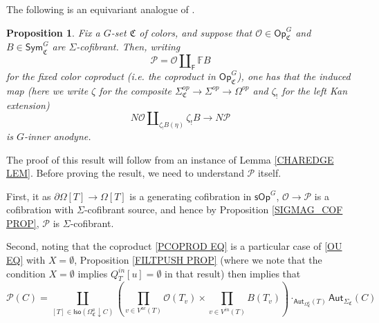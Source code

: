 \documentclass[a4paper,10pt
,draft
]{article}%
\numberwithin{equation}{section}
\numberwithin{figure}{section}
\newtheorem{proposition}[equation]{Proposition}%
\theoremstyle{definition} %
\newcommand{\Op}{\mathsf{Op}}%
\newcommand{\sOp}{\ensuremath{\mathsf{sOp}}}%
\renewcommand{\O}{\ensuremath{\mathcal O}}
\renewcommand{\P}{\ensuremath{\mathcal P}}
\newcommand{\1}{\ensuremath{\mathbbm 1}}%
\begin{document}
The following is an equivariant analogue of \cite[Prop. 3.2]{CM13b}.

\begin{proposition}\label{KEYPR PROP}
	Fix a $G$-set $\mathfrak{C}$ of colors,
	and suppose that 
	$\mathcal{O} \in \mathsf{Op}^{G}_{\mathfrak{C}}$
	and
	$B \in \mathsf{Sym}^{G}_{\mathfrak{C}}$
	are
	$\Sigma$-cofibrant.
	Then, writing
	\begin{equation}\label{PCOPROD EQ}
	\mathcal{P} = \mathcal{O} \amalg_{\mathsf{F}} \mathbb{F} B
	\end{equation}
	for the fixed color coproduct (i.e. the coproduct in $\Op^{G}_{ \mathfrak C}$),
	one has that the induced map
	(here we write $\zeta$ for the composite
	$\Sigma_{\mathfrak{C}}^{op} \to \Sigma^{op} \to \Omega^{op}$
	and $\zeta_!$ for the left Kan extension)
	\begin{equation}\label{ANODYNEMAP EQ}
	N \mathcal{O} \amalg_{\zeta_!B (\eta)} \zeta_!B \to N \mathcal{P}
	\end{equation}
	is $G$-inner anodyne.
%
\end{proposition}


The proof of this result will follow from an instance of 
Lemma \ref{CHAREDGE LEM}. 
Before proving the result, we need to understand $\mathcal{P}$ itself.

First, it as $\partial \Omega[T] \to \Omega[T]$ is a generating cofibration in $\sOp^G$,
$\O \to \P$ is a cofibration with $\Sigma$-cofibrant source, and hence by Proposition \ref{SIGMAG_COF PROP},
$\P$ is $\Sigma$-cofibrant.

Second, noting that the coproduct \eqref{PCOPROD EQ}
is a particular case of \eqref{OU EQ} with $X=\emptyset$,
Proposition \ref{FILTPUSH PROP}
(where we note that the condition $X=\emptyset$ implies
$Q^{in}_T[u] = \emptyset$ in that result)
then implies that  
\begin{equation}\label{PUSHOPPR EQ}
\mathcal{P}(C) = 
\coprod_{
	[T] \in \mathsf{Iso}
	\left( \Omega_{\mathfrak{C}}^a \downarrow C \right)
}
\left(
\prod_{v \in V^{ac}(T)} \mathcal{O}(T_v)
\times
\prod_{v \in V^{in}(T)} B(T_v)
\right)
\cdot_{\mathsf{Aut}_{\Omega^a_{\mathfrak{C}}}(T)} \mathsf{Aut}_{\Sigma_{\mathfrak{C}}}(C)
\end{equation}
\end{document}
